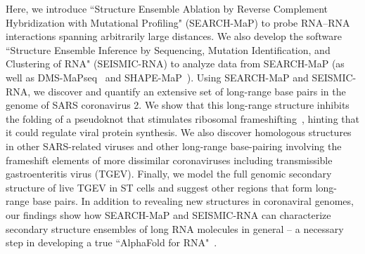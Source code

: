 \documentclass[main.tex]{subfiles}
\begin{document}
Here, we introduce ``Structure Ensemble Ablation by Reverse Complement Hybridization with Mutational Profiling" (SEARCH-MaP) to probe RNA--RNA interactions spanning arbitrarily large distances.
We also develop the software ``Structure Ensemble Inference by Sequencing, Mutation Identification, and Clustering of RNA" (SEISMIC-RNA) to analyze data from SEARCH-MaP (as well as DMS-MaPseq~\cite{Zubradt2016} and SHAPE-MaP~\cite{Siegfried2014}).
Using SEARCH-MaP and SEISMIC-RNA, we discover and quantify an extensive set of long-range base pairs in the genome of SARS coronavirus 2.
We show that this long-range structure inhibits the folding of a pseudoknot that stimulates ribosomal frameshifting~\cite{Kelly2020,KZhang2021}, hinting that it could regulate viral protein synthesis.
We also discover homologous structures in other SARS-related viruses and other long-range base-pairing involving the frameshift elements of more dissimilar coronaviruses including transmissible gastroenteritis virus (TGEV).
Finally, we model the full genomic secondary structure of live TGEV in ST cells and suggest other regions that form long-range base pairs.
In addition to revealing new structures in coronaviral genomes, our findings show how SEARCH-MaP and SEISMIC-RNA can characterize secondary structure ensembles of long RNA molecules in general -- a necessary step in developing a true ``AlphaFold for RNA"~\cite{Schneider2023}.
\end{document}
